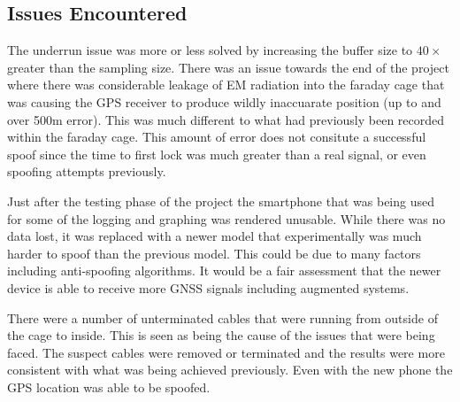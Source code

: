 \subsection{Issues Encountered}
The underrun issue was more or less solved by increasing the buffer size to $40\times$ greater than the sampling size.
There was an issue towards the end of the project where there was considerable leakage of EM radiation into the faraday cage that was causing the GPS receiver to produce
wildly inaccuarate position (up to and over 500m error). This was much different to what had previously been recorded within the faraday cage. This amount of error does
not consitute a successful spoof since the time to first lock was much greater than a real signal, or even spoofing attempts previously. 

Just after the testing phase of the project the smartphone that was being used for some of the logging and graphing was rendered unusable. While there was no data lost,
it was replaced with a newer model that experimentally was much harder to spoof than the previous model. This could be due to many factors including anti-spoofing
algorithms. It would be a fair assessment that the newer device is able to receive more GNSS signals including augmented systems.

There were a number of unterminated cables that were running from outside of the cage to inside. This is seen as being the cause of the issues that were being faced. The
suspect cables were removed or terminated and the results were more consistent with what was being achieved previously. Even with the new phone the GPS location was able
to be spoofed.